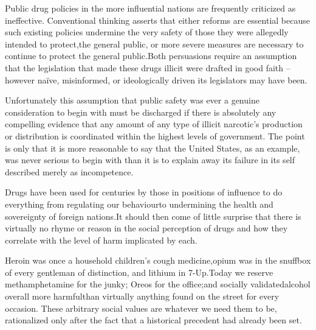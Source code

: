 Public drug policies in the more influential nations are frequently criticized as ineffective. Conventional thinking asserts that either reforms are essential because such existing policies undermine the very safety of those they were allegedly intended to protect, the general public, or more severe measures are necessary to continue to protect the general public. Both persuasions require an assumption that the legislation that made these drugs illicit were drafted in good faith -- however naïve, misinformed, or ideologically driven its legislators may have been.

Unfortunately this assumption that public safety was ever a genuine consideration to begin with must be discharged if there is absolutely any compelling evidence that any amount of any type of illicit narcotic's production or distribution is coordinated within the highest levels of government. The point is only that it is more reasonable to say that the United States, as an example, was never serious to begin with than it is to explain away its failure in its self described  merely as incompetence. 

Drugs have been used for centuries by those in positions of influence to do everything from regulating our behaviour\footnotecite[wilson2007] to undermining the health and sovereignty of foreign nations. It should then come of little surprise that there is virtually no rhyme or reason in the social perception of drugs and how they correlate with the level of harm implicated by each.

Heroin was once a household children's cough medicine, opium was in the snuffbox of every gentleman of distinction, and lithium in 7-Up. Today we reserve methamphetamine for the junky; Oreos for the office; and socially validated alcohol overall more harmful\footnotecite[extras={ See figure 2.}][nutt2010] than virtually anything found on the street for every occasion. These arbitrary social values are whatever we need them to be, rationalized only after the fact that a historical precedent had already been set.


